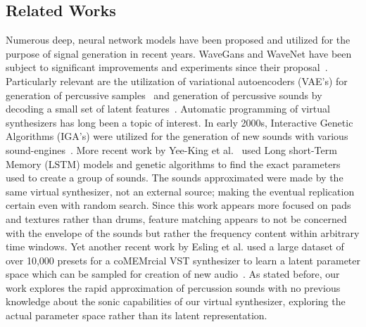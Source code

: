 \documentclass[runningheads,a4paper]{llncs}
\begin{document}
\subsection{Related Works}

Numerous deep, neural network models have been proposed and utilized for the purpose of signal generation in recent years. WaveGans and WaveNet have been subject to significant improvements and experiments since their proposal~\cite{nsynth2017,yamamoto2020parallel,oord2017parallel}. Particularly relevant are the utilization of variational autoencoders (VAE's) for generation of percussive samples~\cite{aouameur2019neural} and generation of percussive sounds by decoding a small set of latent features~\cite{ramires2020neural}.
Automatic programming of virtual synthesizers has long been a topic of interest. In early 2000s, Interactive Genetic Algorithms (IGA's) were utilized for the generation of new sounds with various sound-engines~\cite{johnson1999exploring,dahlstedt2001creating}. More recent work by Yee-King et al.~\cite{yee2018automatic} used Long short-Term Memory (LSTM) models and genetic algorithms to find the exact parameters used to create a group of sounds. The sounds approximated were made by the same virtual synthesizer, not an external source; making the eventual replication certain even with random search. Since this work appears more focused on pads and textures rather than drums, feature matching appears to not be concerned with the envelope of the sounds but rather the frequency content within arbitrary time windows. Yet another recent work by Esling et al. used a large dataset of over 10,000 presets for a coMEMrcial VST synthesizer to learn a latent parameter space which can be sampled for creation of new audio~\cite{esling2019universal}. As stated before, our work explores the rapid approximation of percussion sounds with no previous knowledge about the sonic capabilities of our virtual synthesizer, exploring the actual parameter space rather than its latent representation.
\label{related_works}
\begin{center}
\begin{table}
\caption{Quick reference of recent related works}
\end{table}
\label{table:recent_works}
\end{center}
\end{document}
